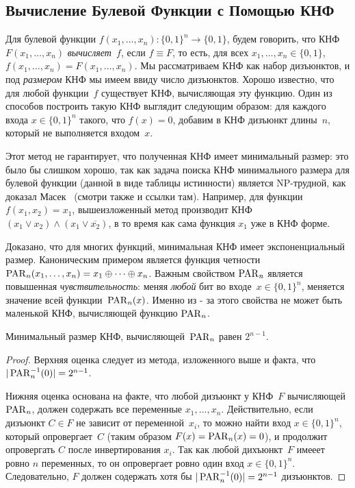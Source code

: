 \subsection{Вычисление Булевой Функции с Помощью КНФ}
Для булевой функции $f(x_1, \dotsc, x_n) \colon \{0,1\}^n \to \{0,1\}$, будем говорить, что КНФ~$F(x_1, \dotsc, x_n)$ \emph{вычисляет~$f$}, если $f \equiv F$, то есть, для всех $x_1, \dotsc, x_n \in \{0,1\}$, $f(x_1, \dotsc, x_n)=F(x_1, \dotsc, x_n)$.
Мы рассматриваем КНФ как набор дизъюнктов, и под \emph{размером} КНФ мы имеем ввиду число дизъюнктов.
Хорошо известно, что для любой функции~$f$ существует КНФ, вычисляющая эту функцию. Один из способов построить такую КНФ выглядит следующим образом: для каждого входа $x \in \{0,1\}^n$ такого, что $f(x)=0$, добавим в КНФ дизъюнкт длины~$n$, который не выполняется входом~$x$.

Этот метод не гарантирует, что полученная КНФ имеет минимальный размер: это было бы слишком хорошо, так как задача поиска КНФ минимального размера для булевой функции (данной в виде таблицы истинности) является NP-трудной, как доказал Масек~\cite{MasekNpComp} (смотри также \cite{DBLP:journals/siamcomp/AllenderHMPS08} и ссылки там).
Например, для функции $f(x_1,x_2)=x_1$, вышеизложенный метод производит КНФ $({x_1} \lor x_2) \land ({x_1} \lor \overline{x_2})$, в то время как сама функция $x_1$ уже в КНФ форме.

Доказано, что для многих функций, минимальная КНФ имеет экспоненциальный размер. Каноническим примером является функция четности $\operatorname{PAR}_n(x_1, \dotsc, x_n)=x_1 \oplus \dotsb \oplus x_n$. Важным свойством $\operatorname{PAR}_n$ является повышенная \emph{чувствительность}: меняя \emph{любой} бит во входе~$x \in \{0,1\}^n$, меняется значение всей функции~$\operatorname{PAR}_n(x)$. Именно из - за этого свойства не может быть маленькой КНФ, вычисляющей функцию $\operatorname{PAR}_n$.

\begin{lemma}\label{lemma:detparity}
	Минимальный размер КНФ, вычисляющей~$\operatorname{PAR}_n$ равен $2^{n-1}$.
\end{lemma}
\begin{proof}
	Верхняя оценка следует из метода, изложенного выше и факта, что $|\operatorname{PAR}_n^{-1}(0)|=2^{n-1}$.
	
	Нижняя оценка основана на факте, что любой дизъюнкт у КНФ~$F$ вычисляющей $\operatorname{PAR}_n$, должен содержать все переменные $x_1, \dotsc, x_n$.
	Действительно, если дизъюнкт $C \in F$ не зависит от переменной~$x_i$, то можно найти вход $x \in \{0,1\}^n$, который опровергает~$C$ (таким образом $F(x)=\operatorname{PAR}_n(x)=0$), и продолжит опровергать $C$ после инвертирования $x_i$. 
	Так как любой дихъюнкт~$F$ имееет ровно $n$ переменных, то он опровергает ровно один вход $x \in \{0,1\}^n$. Следовательно, $F$ должен содержать хотя бы  $|\operatorname{PAR}_n^{-1}(0)|=2^{n-1}$ дизъюнктов.
\end{proof}

